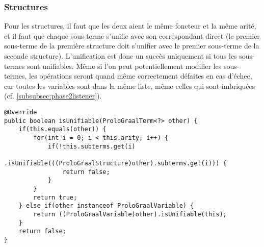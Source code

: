 \documentclass[../report.tex]{subfiles}
\begin{document}
\subsubsection{Structures}
Pour les structures, il faut que les deux aient le même foncteur et la même arité, et il faut que chaque sous-terme s'unifie avec son correspondant direct (le premier sous-terme de la première structure doit s'unifier avec le premier sous-terme de la seconde structure). L'unification est donc un succès uniquement si tous les sous-termes sont unifiables. Même si l'on peut potentiellement modifier les sous-termes, les opérations seront quand même correctement défaites en cas d'échec, car toutes les variables sont dans la même liste, même celles qui sont imbriquées (cf. \ref{subsubsec:phase2listener}). 
\begin{verbatim}
@Override
public boolean isUnifiable(ProloGraalTerm<?> other) {
    if(this.equals(other)) {
        for(int i = 0; i < this.arity; i++) {
            if(!this.subterms.get(i)
                .isUnifiable(((ProloGraalStructure)other).subterms.get(i))) {
                return false;
            }
        }
        return true;
    } else if(other instanceof ProloGraalVariable) {
        return ((ProloGraalVariable)other).isUnifiable(this);
    }
    return false;
}
\end{verbatim}
\end{document}
